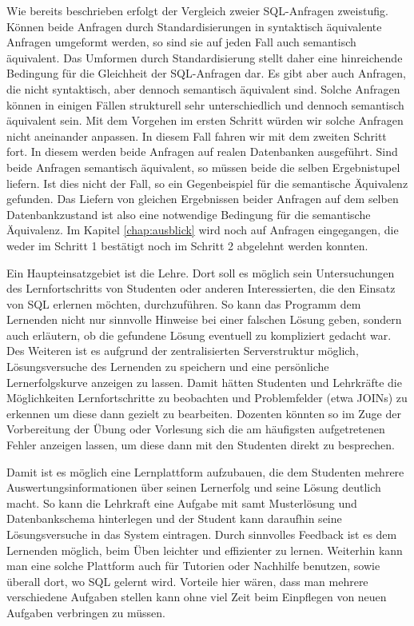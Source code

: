 Wie bereits beschrieben erfolgt der Vergleich zweier SQL-Anfragen zweistufig. Können beide Anfragen durch Standardisierungen in syntaktisch äquivalente Anfragen umgeformt werden, so sind sie auf jeden Fall auch semantisch äquivalent. Das Umformen durch Standardisierung stellt daher eine hinreichende Bedingung für die Gleichheit der SQL-Anfragen dar. Es gibt aber auch Anfragen, die nicht syntaktisch, aber dennoch semantisch äquivalent sind. Solche Anfragen können in einigen Fällen strukturell sehr unterschiedlich und dennoch semantisch äquivalent sein. Mit dem Vorgehen im ersten Schritt würden wir solche Anfragen nicht aneinander anpassen. In diesem Fall fahren wir mit dem zweiten Schritt fort. In diesem werden beide Anfragen auf realen Datenbanken ausgeführt. Sind beide Anfragen semantisch äquivalent, so müssen beide die selben Ergebnistupel liefern. Ist dies nicht der Fall, so ein Gegenbeispiel für die semantische Äquivalenz gefunden. Das Liefern von gleichen Ergebnissen beider Anfragen auf dem selben Datenbankzustand ist also eine notwendige Bedingung für die semantische Äquivalenz. Im Kapitel \ref{chap:ausblick} wird noch auf Anfragen eingegangen, die weder im Schritt 1 bestätigt noch im Schritt 2 abgelehnt werden konnten. 


Ein Haupteinsatzgebiet ist die Lehre. Dort soll es möglich sein Untersuchungen des Lernfortschritts von Studenten oder anderen Interessierten, die den Einsatz von SQL erlernen möchten, durchzuführen. So kann das Programm dem Lernenden nicht nur sinnvolle Hinweise bei einer falschen Lösung geben, sondern auch erläutern, ob die gefundene Lösung eventuell zu kompliziert gedacht war. Des Weiteren ist es aufgrund der zentralisierten Serverstruktur möglich, Lösungsversuche des Lernenden zu speichern und eine persönliche Lernerfolgskurve anzeigen zu lassen. Damit hätten Studenten und Lehrkräfte die Möglichkeiten Lernfortschritte zu beobachten und Problemfelder (etwa JOINs) zu erkennen um diese dann gezielt zu bearbeiten. Dozenten könnten so im Zuge der Vorbereitung der Übung oder Vorlesung sich die am häufigsten aufgetretenen Fehler anzeigen lassen, um diese dann mit den Studenten direkt zu besprechen.

Damit ist es möglich eine Lernplattform aufzubauen, die dem Studenten mehrere Auswertungsinformationen über seinen Lernerfolg und seine Lösung deutlich macht. So kann die Lehrkraft eine Aufgabe mit samt Musterlösung und Datenbankschema hinterlegen und der Student kann daraufhin seine Lösungsversuche in das System eintragen. Durch sinnvolles Feedback ist es dem Lernenden möglich, beim Üben leichter und effizienter zu lernen. Weiterhin kann man eine solche Plattform auch für Tutorien oder Nachhilfe benutzen, sowie überall dort, wo SQL gelernt wird. Vorteile hier wären, dass man mehrere verschiedene Aufgaben stellen kann ohne viel Zeit beim Einpflegen von neuen Aufgaben verbringen zu müssen.

